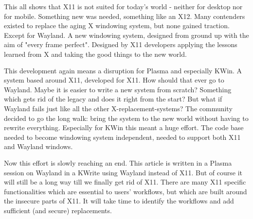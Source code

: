 This all shows that X11 is not suited for today's world - neither for desktop nor for mobile. Something new was needed, something like an X12. Many contenders existed to replace the aging X windowing system, but none gained traction. Except for Wayland. A new windowing system, designed from ground up with the aim of "every frame perfect". Designed by X11 developers applying the lessons learned from X and taking the good things to the new world.

This development again means a disruption for Plasma and especially KWin. A system based around X11, developed for X11. How should that ever go to Wayland. Maybe it is easier to write a new system from scratch? Something which gets rid of the legacy and does it right from the start? But what if Wayland fails just like all the other X-replacement-systems? The community decided to go the long walk: bring the system to the new world without having to rewrite everything. Especially for KWin this meant a huge effort. The code base needed to become windowing system independent, needed to support both X11 and Wayland windows.

Now this effort is slowly reaching an end. This article is written in a Plasma session on Wayland in a KWrite using Wayland instead of X11. But of course it will still be a long way till we finally get rid of X11. There are many X11 specific functionalities which are essential to users' workflows, but which are built around the insecure parts of X11. It will take time to identify the workflows and add sufficient (and secure) replacements.
